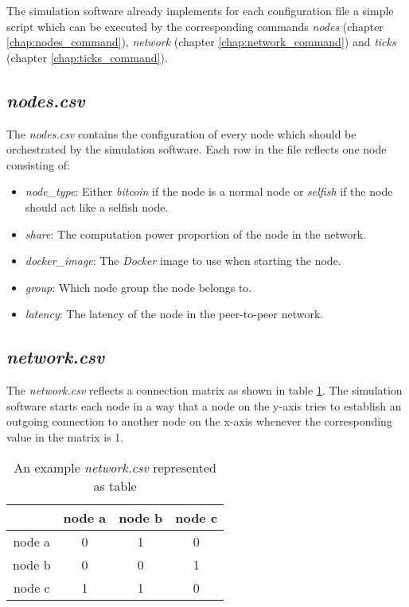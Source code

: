 
The simulation software already implements for each configuration file a simple script which can be executed by the corresponding commands \textit{nodes} (chapter \ref{chap:nodes_command}), \textit{network} (chapter \ref{chap:network_command}) and \textit{ticks} (chapter \ref{chap:ticks_command}).

\subsection{\textit{nodes.csv}}

The \textit{nodes.csv} contains the configuration of every node which should be orchestrated by the simulation software.
Each row in the file reflects one node consisting of:
\begin{itemize}
	\item \textit{node\_type}: Either \textit{bitcoin} if the node is a normal node or \textit{selfish} if the node should act like a selfish node.
	\item \textit{share}: The computation power proportion of the node in the network.
	\item \textit{docker\_image}: The \textit{Docker} image to use when starting the node.
	\item \textit{group}: Which node group the node belongs to. 
	\item \textit{latency}: The latency  of the node in the peer-to-peer network.
\end{itemize}
 
\subsection{\textit{network.csv}}
The \textit{network.csv} reflects a connection matrix as shown in table \ref{tab:network_csv}.
The simulation software starts each node in a way that a node on the y-axis tries to establish an outgoing connection to another node on the x-axis whenever the corresponding value in the matrix is 1.

\begin{table}
  \centering
  \begin{tabular}{c|ccc}
    			& node a 	& node b	& node c	\\
    \hline
    node a		& 0			& 1         & 0         \\
    node b      & 0         & 0         & 1			\\
    node c      & 1         & 1			& 0         \\
  \end{tabular}
  \caption{An example \textit{network.csv} represented as table}
  \label{tab:network_csv}
\end{table}


